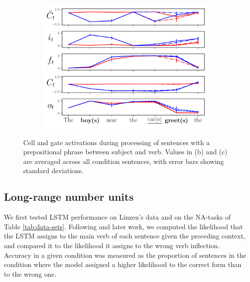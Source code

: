 \begin{figure}[ht]
\begin{subfigure}{0.32\textwidth}
    \label{fig:singular-unit}
    \end{subfigure}
    \begin{subfigure}{0.32\textwidth}
            \centering
            \includegraphics[width=\linewidth]{Figures/nounpp_775.pdf}
    \label{fig:plural-unit}
    \end{subfigure}
\caption{Cell and gate activations during processing of sentences with a prepositional phrase between subject and verb. Values in (b) and (c) are averaged across all condition sentences, with error bars showing standard deviations.}
\end{figure}

\subsection{Long-range number units}\label{subsec:ablation}
We first tested LSTM performance on Linzen's data and on the NA-tasks of Table
\ref{tab:data-sets}. Following
 and later work, we computed the likelihood
that the LSTM assigns to the main verb of each sentence given the
preceding context, and compared it to the likelihood it assigns to the
wrong verb inflection. Accuracy in a given condition was measured as the proportion of sentences in the condition where the model assigned a higher likelihood to the correct form than to the wrong one.

